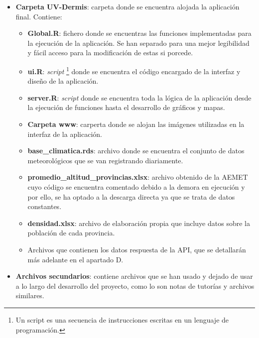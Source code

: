 \begin{itemize}
\begin{itemize}
        \item \textbf{C\_manual\_programador.tex}: documento \textit{LaTex}  de Anexos que incluye la información acerca de los directorios entregados y detalla el porceso de compilación y ejecución de la plataforma, también especifica las instrucciones de las posibles mejoras del proyecto.
        \item \textbf{D\_datos.tex}: documento \textit{LaTex}  de Anexos acerca del proceso de adquisición y limpieza de los datos utilizados en la implementación de la aplicación.
        
    \end{itemize}
    \item \textbf{Carpeta UV-Dermis}: carpeta donde se encuentra alojada la aplicación final. Contiene:
    \begin{itemize}
        \item \textbf{Global.R}: fichero donde se encuentras las funciones implementadas para la ejecución de la aplicación. Se han separado para una mejor legibilidad y fácil acceso para la modificación de estas si porcede.
        \item \textbf{ui.R}:  \textit{script} \footnote{ Un script es una secuencia de instrucciones escritas en un lenguaje de programación.} donde se encuentra el código encargado de la interfaz y diseño de la aplicación.
        \item \textbf{server.R}: \textit{script} donde se encuentra toda la lógica de la aplicación desde la ejecución de funciones hasta el desarrollo de gráficos y mapas.
        \item \textbf{Carpeta www}: carperta donde se alojan las imágenes utilizadas en la interfaz de la aplicación.
        \item \textbf{base\_climatica.rds}: archivo donde se encuentra el conjunto de datos meteorológicos que se van registrando diariamente.
        \item \textbf{promedio\_altitud\_provincias.xlsx}: archivo obtenido de la AEMET cuyo código se encuentra comentado debido a la demora en ejecución y por ello, se ha optado a la descarga directa ya que se trata de datos constantes.
        \item \textbf{densidad.xlsx}: archivo de elaboración propia  que incluye datos sobre la población de cada provincia.
        \item Archivos que contienen los datos respuesta de la API, que se detallarán más adelante en el apartado D.
    \end{itemize}
    \item \textbf{Archivos secundarios}: contiene archivos que se han usado y dejado de usar a lo largo del desarrollo del proyecto, como lo son notas de tutorías y archivos similares.
    
\end{itemize}

